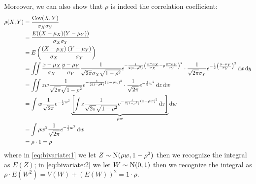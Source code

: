 \documentclass[14pt]{extarticle}
\newcommand{\cov}{{\operatorfont Cov}}
\newcommand{\Normal}{{\operatorfont N}}
\begin{document}
Moreover, we can also show that $\rho$ is indeed the correlation coefficient:
\begin{align}
    \rho(X, Y) & = \frac{\cov(X, Y)}{\sigma_X \sigma_Y}                                                                                                                                                                                                                                                                                             \\
               & = \frac{E((X - \mu_X)(Y-\mu_Y))}{\sigma_X \sigma_Y}                                                                                                                                                                                                                                                                                \\
               & = E\left(\frac{(X - \mu_X)}{\sigma_X}\frac{(Y-\mu_Y)}{\sigma_Y}\right)                                                                                                                                                                                                                                                             \\
               & = \iint \frac{x - \mu_X}{\sigma_X} \frac{y - \mu_Y}{\sigma_Y} \frac{1}{\sqrt{2 \pi} \sigma_X \sqrt{1- \rho^2}} e^{-\frac{1}{2(1-\rho^2)} \left( \frac{x - \mu_X}{\sigma_X} - \rho \frac{y-\mu_Y}{\sigma_Y} \right)^2} \cdot \frac{1}{\sqrt{2 \pi} \sigma_Y} e^{-\frac{1}{2} \left(\frac{y-\mu_Y}{\sigma_Y}\right)^2} \dd{x} \dd{y} \\
               & = \iint z w\frac{1}{\sqrt{2 \pi} \sqrt{1- \rho^2}} e^{-\frac{1}{2(1-\rho^2)} \left( z - \rho w \right)^2} \cdot \frac{1}{\sqrt{2 \pi}} e^{-\frac{1}{2} w^2} \dd{z} \dd{w}                                                                                                                                                          \\
               & = \int w \frac{1}{\sqrt{2 \pi}}e^{-\frac{1}{2} w^2} \underbrace{\left[ \int z \frac{1}{\sqrt{2 \pi} \sqrt{1- \rho^2}} e^{-\frac{1}{2(1-\rho^2)} \left( z - \rho w \right)^2} \dd{z} \right]}_{\rho w} \dd{w} \label{eq:bivariate:1}                                                                                                \\
               & = \int \rho w^2 \frac{1}{\sqrt{2 \pi}}e^{-\frac{1}{2} w^2} \dd{w}                                                                                                                                                                                                                                                                  \\
               & = \rho \cdot 1 = \rho \label{eq:bivariate:2}
\end{align}
where in \autoref{eq:bivariate:1} we let $Z \sim \Normal(\rho w, 1-\rho^2)$ then we recognize the integral as $E(Z)$;
in \autoref{eq:bivariate:2} we let $W \sim \Normal(0,1)$ then we recognize the integral as $\rho \cdot E(W^2) = V(W) + \left(E(W)\right)^2 = 1 \cdot \rho$.
\end{document}
